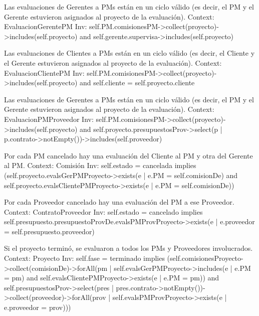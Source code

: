 \begin{listocl}

\begin{itemocl}{Las evaluaciones de Gerentes a PMs están en un ciclo válido (es decir, el PM y el Gerente estuvieron asignados al proyecto de la evaluación).}
Context: EvaluacionGerentePM
Inv: self.PM.comisionesPM->collect(proyecto)->includes(self.proyecto) and self.gerente.supervisa->includes(self.proyecto)
\end{itemocl}

\begin{itemocl}{Las evaluaciones de Clientes a PMs están en un ciclo válido (es decir, el Cliente y el Gerente estuvieron asignados al proyecto de la evaluación).}
Context: EvaluacionClientePM
Inv: self.PM.comisionesPM->collect(proyecto)->includes(self.proyecto) and self.cliente = self.proyecto.cliente
\end{itemocl}

\begin{itemocl}{Las evaluaciones de Gerentes a PMs están en un ciclo válido (es decir, el PM y el Gerente estuvieron asignados al proyecto de la evaluación).}
Context: EvaluacionPMProveedor
Inv: self.PM.comisionesPM->collect(proyecto)->includes(self.proyecto) and self.proyecto.presupuestosProv->select(p | p.contrato->notEmpty())->includes(self.proveedor)
\end{itemocl}

\begin{itemocl}{Por cada PM cancelado hay una evaluación del Cliente al PM y otra del Gerente al PM.}
Context: Comisión
Inv: self.estado = cancelada implies (self.proyecto.evalsGerPMProyecto->exists(e | e.PM = self.comisionDe) and self.proyecto.evalsClientePMProyecto->exists(e | e.PM = self.comisionDe))
\end{itemocl}

\begin{itemocl}{Por cada Proveedor cancelado hay una evaluación del PM a ese Proveedor.}
Context: ContratoProveedor
Inv: self.estado = cancelado implies self.presupuesto.presupuestoProvDe.evalsPMProvProyecto->exists(e | e.proveedor = self.presupuesto.proveedor)
\end{itemocl}

\begin{itemocl}{Si el proyecto terminó, se evaluaron a todos los PMs y Proveedores involucrados.}
Context: Proyecto
Inv: self.fase = terminado implies (self.comisionesProyecto->collect(comisionDe)->forAll(pm | self.evalsGerPMProyecto->includes(e | e.PM = pm) and self.evalsClientePMProyecto->exists(e | e.PM = pm)) and self.presupuestosProv->select(pres | pres.contrato->notEmpty())->collect(proveedor)->forAll(prov | self.evalsPMProvProyecto->exists(e | e.proveedor = prov)))
\end{itemocl}


\end{listocl}
